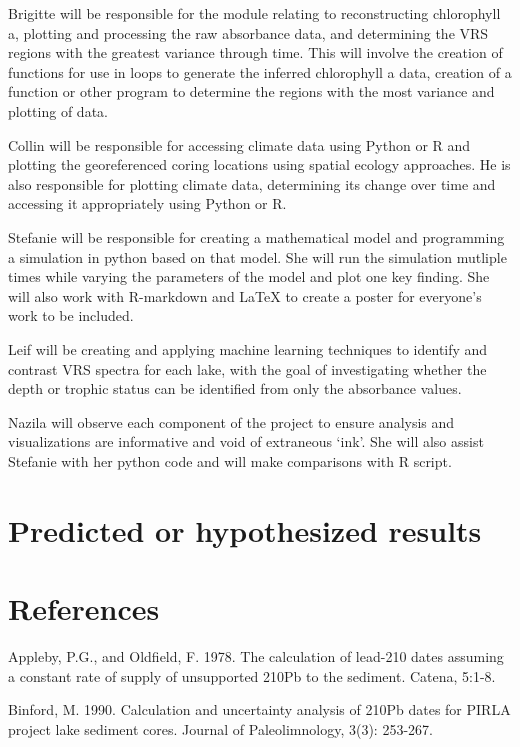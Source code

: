 \documentclass[]{article}
\begin{document}
Brigitte will be responsible for the module relating to reconstructing
chlorophyll a, plotting and processing the raw absorbance data, and
determining the VRS regions with the greatest variance through time.
This will involve the creation of functions for use in loops to generate
the inferred chlorophyll a data, creation of a function or other program
to determine the regions with the most variance and plotting of data.

Collin will be responsible for accessing climate data using Python or R
and plotting the georeferenced coring locations using spatial ecology
approaches. He is also responsible for plotting climate data,
determining its change over time and accessing it appropriately using
Python or R.

Stefanie will be responsible for creating a mathematical model and
programming a simulation in python based on that model. She will run the
simulation mutliple times while varying the parameters of the model and
plot one key finding. She will also work with R-markdown and LaTeX to
create a poster for everyone's work to be included.

Leif will be creating and applying machine learning techniques to
identify and contrast VRS spectra for each lake, with the goal of
investigating whether the depth or trophic status can be identified from
only the absorbance values.

Nazila will observe each component of the project to ensure analysis and
visualizations are informative and void of extraneous `ink'. She will
also assist Stefanie with her python code and will make comparisons with
R script.

\section{Predicted or hypothesized
results}\label{predicted-or-hypothesized-results}

\section{References}\label{references}

Appleby, P.G., and Oldfield, F. 1978. The calculation of lead-210 dates
assuming a constant rate of supply of unsupported 210Pb to the sediment.
Catena, 5:1-8.

Binford, M. 1990. Calculation and uncertainty analysis of 210Pb dates
for PIRLA project lake sediment cores. Journal of Paleolimnology, 3(3):
253-267.
\end{document}
